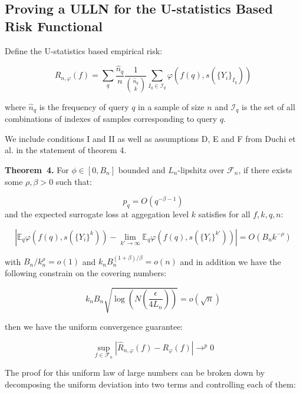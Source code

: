 \documentclass[a4paper,10pt]{article}
\newenvironment{theorem}[1][]{\par\medskip
   \noindent \textbf{Theorem~#1.} \rmfamily}{\medskip}
\begin{document}
\subsection{Proving a ULLN for the U-statistics Based Risk Functional}

Define the U-statistics based empirical risk:

\begin{equation} \label{eq:er}
  \hat{R}_{n, \varphi}(f) = \sum_q \frac{\hat{n}_q}{n} \frac{1}{\binom{\hat{n}_q}{k}} \sum_{I_q \in \mathcal{I}_q}\varphi(f(q), s(\{Y_i\}_{I_q}))
\end{equation}

where \(\hat{n}_q\) is the frequency of query \(q\) in a sample of size \(n\) and \(\mathcal{I}_q\) is the set of all combinations of indexes of samples corresponding to query \(q\).

We include conditions I and II as well as assumptions D, E and F from Duchi et al. \cite{duchi-2013-ranking} in the statement of theorem 4.
\begin{theorem}[4]
  For \(\phi \in [0, B_n]\) bounded and \(L_n\)-lipshitz over \(\mathcal{F}_n\),
  if there exists some \(\rho, \beta > 0\) such that:

  \begin{equation}
    p_q = O(q^{-\beta -1})
  \end{equation}
  and the expected surrogate loss at aggegation level \(k\) satisfies for all \(f, k, q, n\):

  \begin{equation}
    \left|\mathbb{E}_q\varphi(f(q), s(\{Y_i\}^k)) - \lim_{k' \rightarrow \infty}\mathbb{E}_q\varphi(f(q), s(\{Y_i\}^{k'}))\right| = O(B_nk^{-\rho})
  \end{equation}

  with \(B_n/k_n^\rho = o(1)\) and \(k_nB_n^{(1+\beta)/\beta}=o(n)\) and in addition we have the following constrain on the covering numbers:

  \begin{equation}
    k_nB_n\sqrt{\log\left( N(\frac{\epsilon}{4L_n}) \right)} = o(\sqrt n)
  \end{equation}

  then we have the uniform convergence guarantee:

  \begin{equation}
    \sup_{f \in \mathcal{F}_n}\left| \hat{R}_{n, \varphi}(f) - R_\varphi(f) \right| \rightarrow^p 0
  \end{equation}


\end{theorem}
The proof for this uniform law of large numbers can be broken down by decomposing the uniform deviation into two terms and controlling each of them:
\end{document}
